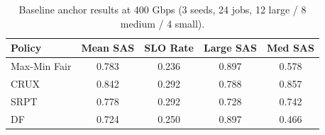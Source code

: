 \begin{table}[t]
\centering
\caption{Baseline anchor results at 400 Gbps (3 seeds, 24 jobs, 12 large / 8 medium / 4 small).}
\label{tab:anchor}
\small
\begin{tabular}{lcccc}
\toprule
Policy & Mean SAS & SLO Rate & Large SAS & Med SAS \\
\midrule
Max-Min Fair & 0.783 & 0.236 & 0.897 & 0.578 \\
CRUX & 0.842 & 0.292 & 0.788 & 0.857 \\
SRPT & 0.778 & 0.292 & 0.728 & 0.742 \\
DF & 0.724 & 0.250 & 0.897 & 0.466 \\
\bottomrule
\end{tabular}
\end{table}
